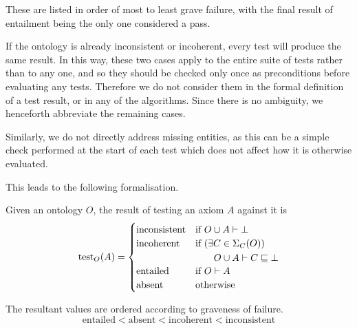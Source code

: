 \documentclass[paper.tex]{subfiles}
\begin{document}
These are listed in order of most to least grave failure, with the final result of entailment being the only one considered a pass.

If the ontology is already inconsistent or incoherent, every test will produce the same result.  In this way, these two cases apply to the entire suite of tests rather than to any one, and so they should be checked only once as preconditions before evaluating any tests.  Therefore we do not consider them in the formal definition of a test result, or in any of the algorithms.  Since there is no ambiguity, we henceforth abbreviate the remaining cases.

Similarly, we do not directly address missing entities, as this can be a simple check performed at the start of each test which does not affect how it is otherwise evaluated.

This leads to the following formalisation.

\begin{definition}
  Given an ontology $O$, the result of testing an axiom $A$ against it is
  \[
    \operatorname{test}_O(A) =
    \begin{cases}
      \mathrm{inconsistent} &
        \text{if } O \cup A \vdash \bot \\
      \mathrm{incoherent} &
        \text{if }
        \! \begin{aligned}[t]
          & (\exists C \in \Sigma_C(O)) \\
          & \quad O \cup A \vdash C \sqsubseteq \bot
        \end{aligned} \\
      \mathrm{entailed} &
        \text{if } O \vdash A \\
      \mathrm{absent} &
        \text {otherwise} \\
    \end{cases}
  \]

  The resultant values are ordered according to graveness of failure.
  \[ \mathrm{entailed} < \mathrm{absent} < \mathrm{incoherent} < \mathrm{inconsistent} \]
\end{definition}
\end{document}
